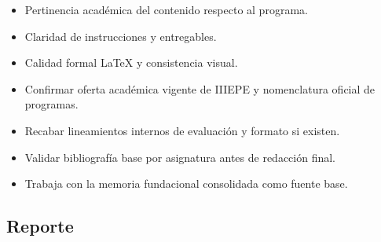 \documentclass[12pt]{article}
\begin{document}
\begin{itemize}[leftmargin=*]
  \item Pertinencia académica del contenido respecto al programa.
  \item Claridad de instrucciones y entregables.
  \item Calidad formal LaTeX y consistencia visual.
  \item Confirmar oferta académica vigente de IIIEPE y nomenclatura oficial de programas.
  \item Recabar lineamientos internos de evaluación y formato si existen.
  \item Validar bibliografía base por asignatura antes de redacción final.
  \item Trabaja con la memoria fundacional consolidada como fuente base.
\end{itemize}

\subsection*{Reporte}
\end{document}

